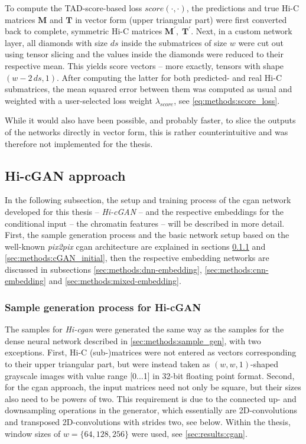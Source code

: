 To compute the TAD-score-based loss $\mathit{score}(\cdot,\cdot)$, the predictions and true Hi-C matrices $\mathbf{M}$ and $\mathbf{T}$ in vector form (upper triangular part)
were first converted back to complete, symmetric Hi-C matrices $\mathbf{M}^\prime,\; \mathbf{T}^\prime$. 
Next, in a custom network layer, all diamonds with size $ds$ inside the submatrices of size $w$ were cut out using tensor slicing and the values inside the diamonds were reduced to their respective mean.
This yields score vectors -- more exactly, tensors with shape $(w - 2\,ds, 1)$.
After computing the latter for both predicted- and real Hi-C submatrices, the mean squared error between them was computed as usual and weighted with 
a user-selected loss weight $\lambda_\mathit{score}$, see \cref{eq:methods:score_loss}.

While it would also have been possible, and probably faster, to slice the outputs of the networks directly in vector form, 
this is rather counterintuitive and was therefore not implemented for the thesis. 
\clearpage 

\subsection{Hi-cGAN approach} \label{sec:methods:hicgan}
In the following subsection, the setup and training process of the \acrshort{cgan} network developed for this thesis -- \emph{Hi-cGAN} -- and the respective
embeddings for the conditional input -- the chromatin features -- will be described in more detail.
First, the sample generation process and the basic network setup based on the well-known \emph{pix2pix} \acrshort{cgan} architecture \cite{Isola2017} 
are explained in sections \ref{sec:methods:sample_gen_cgan} and \ref{sec:methods:cGAN_initial}, 
then the respective embedding networks are discussed in subsections \ref{sec:methods:dnn-embedding},
\ref{sec:methods:cnn-embedding} and \ref{sec:methods:mixed-embedding}.

\subsubsection{Sample generation process for Hi-cGAN} \label{sec:methods:sample_gen_cgan}
The samples for \emph{Hi-\acrshort{cgan}} were generated the same way as the samples for the dense neural network described 
in \cref{sec:methods:sample_gen}, with two exceptions.
First, Hi-C (sub-)matrices were not entered as vectors corresponding to their upper triangular part, 
but were instead taken as $(w, w, 1)$-shaped grayscale images with value range [0...1] in 32-bit floating point format.
Second, for the \acrshort{cgan} approach, the input matrices need not only be square,
but their sizes also need to be powers of two. 
This requirement is due to the connected up- and downsampling operations in the generator, 
which essentially are 2D-convolutions and transposed 2D-convolutions with strides two, see below.
Within the thesis, window sizes of $w=\{64,128,256\}$ were used, see \cref{sec:results:cgan}.

